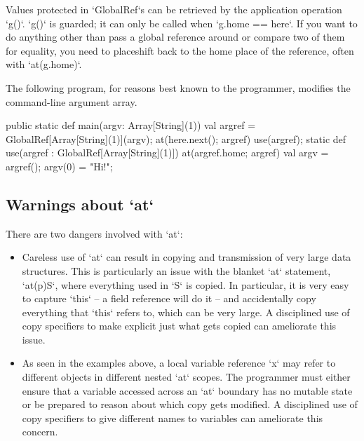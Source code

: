 Values protected in \xcd`GlobalRef`s can be retrieved by the application
operation \xcd`g()`.  \xcd`g()` is guarded; it can 
only be called when \xcd`g.home == here`.  If you  want to do anything other
than pass a global reference around or compare two of them for equality, you
need to placeshift back to the home place of the reference, often with
\xcd`at(g.home)`.   

\begin{ex}The following program, for reasons best known to the programmer,
modifies the 
command-line argument array.

\begin{xten}
  public static def main(argv: Array[String](1)) {
    val argref = GlobalRef[Array[String](1)](argv);
    at(here.next(); argref) 
        use(argref);
  }
  static def use(argref : GlobalRef[Array[String](1)]) {
    at(argref.home; argref) {
      val argv = argref();
      argv(0) = "Hi!";
    }
  }
\end{xten}

\end{ex}



\subsection{Warnings about \xcd`at`}
There are two dangers involved with \xcd`at`: 
\begin{itemize}
\item Careless use of \xcd`at` can result in copying and transmission
of very large data structures.  This is particularly an issue with the blanket
\xcd`at` statement, \xcd`at(p)S`, where everything used in \xcd`S` is copied.  
In particular, it is very easy to capture
\xcd`this` -- a field reference will do it -- and accidentally copy everything
that \xcd`this` refers to, which can be very large.  A disciplined use of copy
specifiers to make explicit just what gets copied can ameliorate this issue.

\item As seen in the examples above, a local variable reference
  \xcd`x` may refer to different objects in different nested \xcd`at`
  scopes. The programmer must either ensure that a variable accessed
  across an \xcd`at` boundary has no mutable state or be prepared to
  reason about which copy gets modified.   A disciplined use of copy specifiers to give
  different names to variables can ameliorate this concern.
\end{itemize}


